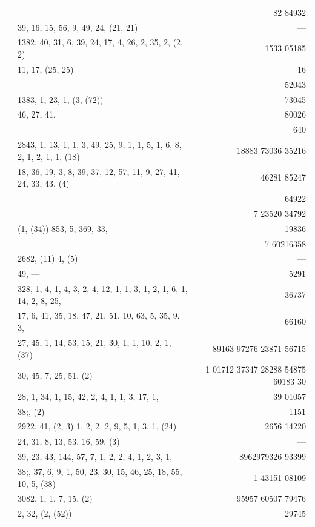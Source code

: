 \documentclass[11pt]{article}
\begin{document}
{\begin{longtable}{|r|p{8.5cm}|r|}
       & & 82 84932 \\
       & 39, 16, 15, 56, 9, 49, 24, (21, 21) & --- \\
       & 1382, 40, 31, 6, 39, 24, 17, 4, 26, 2, 35, 2, (2, 2) & 1533 05185 \\
       & 11, 17, (25, 25) & 16 \\
       & & 52043 \\
       & 1383, 1, 23, 1, (3, (72)) & 73045 \\
       & 46, 27, 41, & 80026 \\
       & & 640 \\
       & 2843, 1, 13, 1, 1, 3, 49, 25, 9, 1, 1, 5, 1, 6, 8, 2, 1, 2, 1, 1, (18) & 18883 73036 35216 \\
       & 18, 36, 19, 3, 8, 39, 37, 12, 57, 11, 9, 27, 41, 24, 33, 43, (4) & 46281 85247 \\
       & & 64922 \\
       & & 7 23520 34792 \\
       & (1, (34)) 853, 5, 369, 33, & 19836 \\
       & & 7 60216358 \\
       & 2682, (11) 4, (5) & --- \\
       & 49, --- & 5291 \\
       & 328, 1, 4, 1, 4, 3, 2, 4, 12, 1, 1, 3, 1, 2, 1, 6, 1, 14, 2, 8, 25, & 36737 \\
       & 17, 6, 41, 35, 18, 47, 21, 51, 10, 63, 5, 35, 9, 3, & 66160 \\
       & 27, 45, 1, 14, 53, 15, 21, 30, 1, 1, 10, 2, 1, (37) & 89163 97276 23871 56715 \\
       & 30, 45, 7, 25, 51, (2) & 1 01712 37347 28288 54875 60183 30 \\
       & 28, 1, 34, 1, 15, 42, 2, 4, 1, 1, 3, 17, 1, & 39 01057 \\
       & $38$;\; 2, (2) & 1151 \\
       & 2922, 41, (2, 3) 1, 2, 2, 2, 9, 5, 1, 3, 1, (24) & 2656 14220 \\
       & 24, 31, 8, 13, 53, 16, 59, (3) & --- \\
       & 39, 23, 43, 144, 57, 7, 1, 2, 2, 4, 1, 2, 3, 1, & 8962979326 93399 \\
       & $38$;\; 2, 37, 6, 9, 1, 50, 23, 30, 15, 46, 25, 18, 55, 10, 5, (38) & 1 43151 08109 \\
       & 3082, 1, 1, 7, 15, (2) & 95957 60507 79476 \\
       & 2, 32, (2, (52)) & 29745 \\

\end{longtable}}
\end{document}
